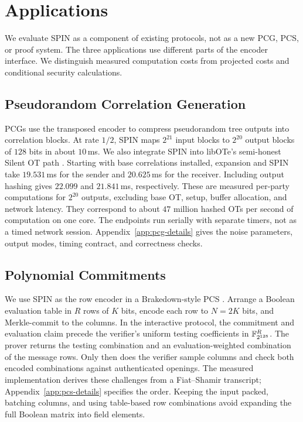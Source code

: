 \section{Applications}
\label{sec:applications}

We evaluate SPIN as a component of existing protocols, not as a new PCG,
PCS, or proof system. The three applications use different parts of the
encoder interface. We distinguish measured computation costs from
projected costs and conditional security calculations.

\subsection{Pseudorandom Correlation Generation}
\label{sec:spin-pcg}

PCGs use the transposed encoder to compress pseudorandom tree outputs
into correlation blocks. At rate $1/2$, SPIN maps $2^{21}$ input blocks
to $2^{20}$ output blocks of $128$ bits in about $10$\,ms.
We also integrate SPIN into libOTe's semi-honest Silent OT path
\cite{bcg19tworound}. Starting with base correlations installed, expansion
and SPIN take $19.531$\,ms for the sender and $20.625$\,ms for the receiver.
Including output hashing gives $22.099$ and $21.841$\,ms, respectively.
These are measured per-party computations for $2^{20}$ outputs, excluding
base OT, setup, buffer allocation, and network latency. They correspond to
about $47$ million hashed OTs per second of computation on one core.
The endpoints run serially with separate timers, not as a timed network session.
Appendix~\ref{app:pcg-details} gives the noise parameters, output modes,
timing contract, and correctness checks.

\subsection{Polynomial Commitments}
\label{sec:spin-pcs}

We use SPIN as the row encoder in a Brakedown-style PCS
\cite{brakedown23}. Arrange a Boolean evaluation table in $R$ rows of
$K$ bits, encode each row to $N=2K$ bits, and Merkle-commit to the columns.
In the interactive protocol, the commitment and evaluation claim precede
the verifier's uniform testing coefficients in $\mathbb F_{2^{128}}^R$.
The prover returns the testing combination and an evaluation-weighted
combination of the message rows. Only then does the verifier sample
columns and check both encoded combinations against authenticated openings.
The measured implementation derives these challenges from a Fiat--Shamir
transcript; Appendix~\ref{app:pcs-details} specifies the order.
Keeping the input packed, batching columns, and using table-based row
combinations avoid expanding the full Boolean matrix into field elements.

